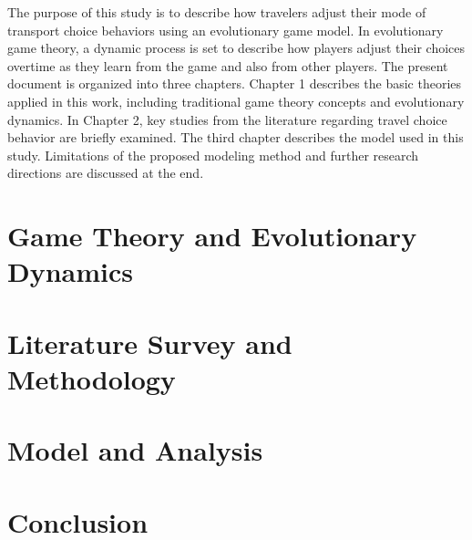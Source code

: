 \documentclass[12pt]{report}
\begin{document}
The purpose of this study is to describe how travelers adjust their mode of transport choice behaviors using an evolutionary game model. In evolutionary game theory, a dynamic process is set to describe how players adjust their choices overtime as they learn from the game and also from other players. The present document is organized into three chapters. Chapter 1 describes the basic theories applied in this work, including traditional game theory concepts and evolutionary dynamics. In Chapter 2, key studies from the literature regarding travel choice behavior are briefly examined. The third chapter describes the model used in this study. Limitations of the proposed modeling method and further research directions are discussed at the end. 

\fancyhf{}
\rhead{\thesection}
\lhead{\leftmark}
\fancyfoot[LE,RO]{\thepage}
\renewcommand{\headrulewidth}{2pt}
\renewcommand{\footrulewidth}{1pt}

\chapter{Game Theory and Evolutionary Dynamics}


\chapter{Literature Survey and Methodology} 


\chapter{Model and Analysis}


\chapter*{Conclusion}

\end{document}

